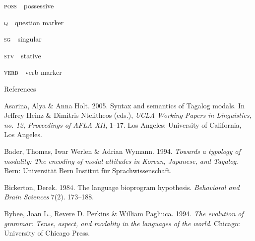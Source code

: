 \begin{styleStandard}
\textsc{poss\ \ }possessive
\end{styleStandard}

\begin{styleStandard}
\textsc{q\ \ }question marker
\end{styleStandard}

\begin{styleStandard}
\textsc{sg\ \ }singular
\end{styleStandard}

\begin{styleStandard}
\textsc{stv\ \ }stative
\end{styleStandard}

\begin{styleStandard}
\textsc{verb\ \ }verb marker
\end{styleStandard}

\begin{stylelsUnNumberedSection}
References
\end{stylelsUnNumberedSection}

\begin{styleBibliography}
Asarina, Alya \& Anna Holt. 2005. Syntax and semantics of Tagalog modals. In Jeffrey Heinz \& Dimitris Ntelitheos (eds.), \textit{UCLA Working Papers in Linguistics, no. 12, Proceedings of AFLA XII}, 1–17. Los Angeles: University of California, Los Angeles.
\end{styleBibliography}

\begin{styleBibliography}
Bader, Thomas, Iwar Werlen \& Adrian Wymann. 1994. \textit{Towards a typology of modality: The encoding of modal attitudes in Korean, Japanese, and Tagalog}. Bern: Universität Bern Institut für Sprachwissenschaft.
\end{styleBibliography}

\begin{styleBibliography}
Bickerton, Derek. 1984. The language bioprogram hypothesis. \textit{Behavioral and Brain Sciences} 7(2). 173–188.
\end{styleBibliography}

\begin{styleBibliography}
Bybee, Joan L., Revere D. Perkins \& William Pagliuca. 1994. \textit{The evolution of grammar: Tense, aspect, and modality in the languages of the world}. Chicago: University of Chicago Press.
\end{styleBibliography}

